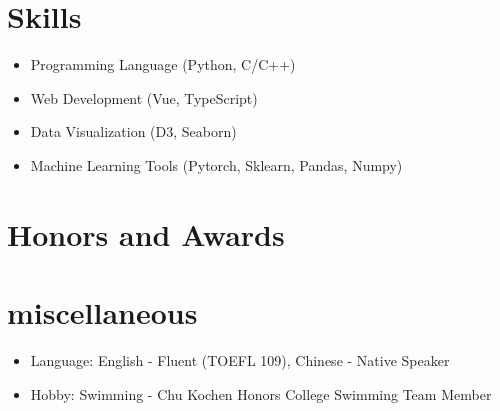 \documentclass{resume}
\begin{document}
\section{Skills}
\begin{itemize}[parsep=0.5ex]
    \item Programming Language (Python, C/C++)
    \item Web Development (Vue, TypeScript)
    \item Data Visualization (D3, Seaborn)
    \item Machine Learning Tools (Pytorch, Sklearn, Pandas, Numpy)
\end{itemize}

\section{Honors and Awards}

\section{miscellaneous}
\begin{itemize}[parsep=0.5ex]
  \item Language: English - Fluent (TOEFL 109), Chinese - Native Speaker
  \item Hobby: Swimming - Chu Kochen Honors College Swimming Team Member
\end{itemize}

%
%
\end{document}
